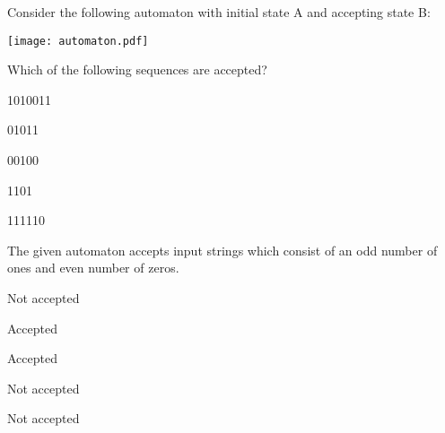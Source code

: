 

\begin{question}

Consider the following automaton with initial state A and accepting state B:

\texttt{[image: automaton.pdf]}

Which of the following sequences are accepted?

\begin{answerlist}
  \item 1010011
  \item 01011
  \item 00100
  \item 1101
  \item 111110
\end{answerlist}
\end{question}


\begin{solution}

The given automaton accepts input strings which consist of an
odd number of ones and
even number of zeros.

\begin{answerlist}
  \item Not accepted
  \item Accepted
  \item Accepted
  \item Not accepted
  \item Not accepted
\end{answerlist}
\end{solution}


